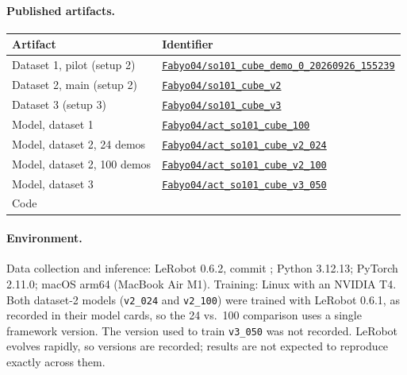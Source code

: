 \documentclass[11pt,a4paper]{article}
\newcommand{\urlRepo}{https://github.com/FabioBariletti/so101-data-efficiency}  %
\newcommand{\linkor}[2]{\ifdefempty{#1}{#2 \textcolor{ink2}{(coming soon)}}{\href{#1}{#2}}}
\begin{document}
\paragraph{Published artifacts.}
\begin{center}
\small
\begin{tabular}{@{}ll@{}}
\toprule
\textbf{Artifact} & \textbf{Identifier} \\
\midrule
Dataset 1, pilot (setup 2) & \href{https://huggingface.co/datasets/Fabyo04/so101_cube_demo_0_20260926_155239}{\texttt{Fabyo04/so101\_cube\_demo\_0\_20260926\_155239}} \\
Dataset 2, main (setup 2) & \href{https://huggingface.co/datasets/Fabyo04/so101_cube_v2}{\texttt{Fabyo04/so101\_cube\_v2}} \\
Dataset 3 (setup 3) & \href{https://huggingface.co/datasets/Fabyo04/so101_cube_v3}{\texttt{Fabyo04/so101\_cube\_v3}} \\
Model, dataset 1 & \href{https://huggingface.co/Fabyo04/act_so101_cube_100}{\texttt{Fabyo04/act\_so101\_cube\_100}} \\
Model, dataset 2, 24 demos & \href{https://huggingface.co/Fabyo04/act_so101_cube_v2_024}{\texttt{Fabyo04/act\_so101\_cube\_v2\_024}} \\
Model, dataset 2, 100 demos & \href{https://huggingface.co/Fabyo04/act_so101_cube_v2_100}{\texttt{Fabyo04/act\_so101\_cube\_v2\_100}} \\
Model, dataset 3 & \href{https://huggingface.co/Fabyo04/act_so101_cube_v3_050}{\texttt{Fabyo04/act\_so101\_cube\_v3\_050}} \\
Code & \linkor{\urlRepo}{GitHub repository} \\
\bottomrule
\end{tabular}
\end{center}

\paragraph{Environment.} Data collection and inference: LeRobot 0.6.2,
commit \texttt{}; Python 3.12.13;
PyTorch 2.11.0; macOS arm64 (MacBook Air M1). Training: Linux with an NVIDIA
T4. Both dataset-2 models (\texttt{v2\_024} and \texttt{v2\_100}) were trained
with LeRobot 0.6.1, as recorded in their model cards, so the 24 vs.\ 100
comparison uses a single framework version. The version used to train
\texttt{v3\_050} was not recorded. LeRobot evolves rapidly, so
versions are recorded; results are not expected to reproduce exactly across
them.
\end{document}
